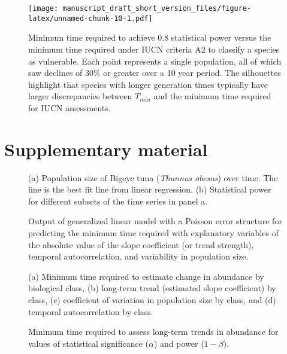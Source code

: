 \documentclass[12pt,]{article}
\begin{document}
\clearpage

\begin{figure}
\centering
\texttt{[image: manuscript\_draft\_short\_version\_files/figure-latex/unnamed-chunk-10-1.pdf]}
\caption{Minimum time required to achieve 0.8 statistical power versus
the minimum time required under IUCN criteria A2 to classify a species
as vulnerable. Each point represents a single population, all of which
saw declines of 30\% or greater over a 10 year period. The silhouettes
highlight that species with longer generation times typically have
larger discrepancies between \(T_{min}\) and the minimum time required
for IUCN assessments.\label{fig:IUCN_analysis}}
\end{figure}

\clearpage

\section{Supplementary material}\label{supplementary-material}

\setcounter{figure}{0} \renewcommand{\thefigure}{A\arabic{figure}}

\begin{figure}[htbp]
\centering
\caption{(a) Population size of Bigeye tuna (\emph{Thunnus obesus}) over
time. The line is the best fit line from linear regression. (b)
Statistical power for different subsets of the time series in panel
a.\label{fig:empirical_approach_example}}
\end{figure}

\begin{figure}[htbp]
\centering
\caption{Output of generalized linear model with a Poisson error
structure for predicting the minimum time required with explanatory
variables of the absolute value of the slope coefficient (or trend
strength), temporal autocorrelation, and variability in population
size.\label{fig:poisson_model}}
\end{figure}

\begin{figure}[htbp]
\centering
\caption{(a) Minimum time required to estimate change in abundance by biological class, (b) long-term trend (estimated slope coefficient) by class, (c) coefficient of variation in population size by class, and (d) temporal autocorrelation by class.\label{fig:class}}
\end{figure}

\begin{figure}[htbp]
\centering
\caption{Minimum time required to assess long-term trends in abundance
for values of statistical significance (\(\alpha\)) and power
(\(1-\beta\)).\label{fig:min_time_vs_alpha_beta}}
\end{figure}
\end{document}

